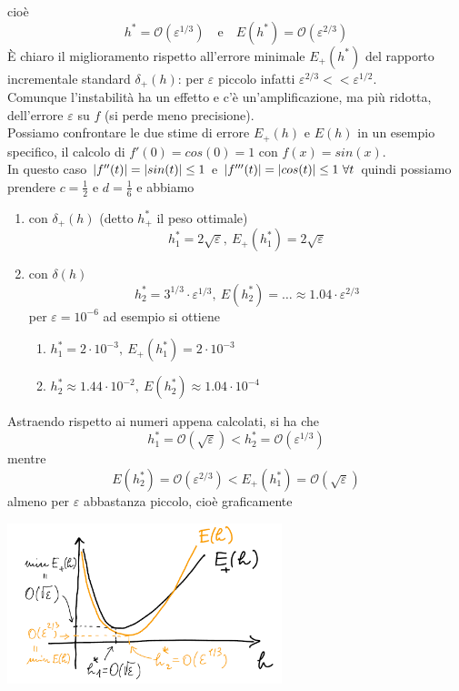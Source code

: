 \documentclass[12pt,a4paper]{article}
\DeclarePairedDelimiter{\abs}{\lvert}{\rvert}
\begin{document}
cioè
\[
h^* = \mathcal{O}(\varepsilon^{1/3}) \quad \text{e} \quad E(h^*) = \mathcal{O}(\varepsilon^{2/3})
\]
È chiaro il miglioramento
rispetto all'errore minimale $E_+(h^*)$ del rapporto incrementale standard $\delta_+(h)$: per $\varepsilon$ piccolo infatti $\varepsilon^{2/3} << \varepsilon^{1/2}$.\\
Comunque l'instabilità ha un effetto e c'è un'amplificazione, ma più ridotta, dell'errore $\varepsilon$ su $f$ (si perde meno precisione).\\
Possiamo confrontare le due stime di errore $E_+(h)$ e $E(h)$ in un esempio specifico, il calcolo di $f'(0) = cos(0) = 1$ con $f(x) = sin(x)$.\\
In questo caso $\abs{f''(t)} = \abs{sin(t)} \le 1$
e $\abs{f'''(t)} = \abs{cos(t)} \le 1 \ \forall t$ quindi possiamo prendere $c = \frac{1}{2}$ e $d = \frac{1}{6}$ e abbiamo
\begin{enumerate}
    \item con $\delta_+(h)$ (detto $h_+^*$ il peso ottimale)
    \[
        h_1^* = 2 \sqrt{\varepsilon}, \ E_+(h_1^*) = 2 \sqrt{\varepsilon}
    \]
    \item con $\delta(h)$
    \[
        h_2^* = 3^{1/3} \cdot \varepsilon^{1/3}, \ E(h_2^*) = \dotso \approx 1.04 \cdot \varepsilon^{2/3}
    \]
    per $\varepsilon = 10^{-6}$ ad esempio si ottiene
    \begin{enumerate}
        \item $h_1^* = 2 \cdot 10^{-3}, \ E_+(h_1^*) = 2 \cdot 10^{-3}$
        \item $h_2^* \approx 1.44 \cdot 10^{-2}, \ E(h_2^*) \approx 1.04 \cdot 10^{-4}$
    \end{enumerate}
\end{enumerate}
Astraendo rispetto ai numeri
appena calcolati, si ha che
\[
h_1^* = \mathcal{O}(\sqrt{\varepsilon}) < h_2^* = \mathcal{O}(\varepsilon^{1/3})
\]
mentre
\[
E(h_2^*) = \mathcal{O}(\varepsilon^{2/3}) < E_+(h_1^*) = \mathcal{O}(\sqrt{\varepsilon})
\]
almeno per $\varepsilon$ abbastanza piccolo, cioè graficamente
\begin{center}
    \includegraphics[width=0.6\textwidth]{pag29.png}
\end{center}
\end{document}
